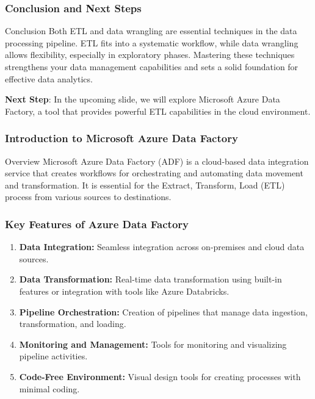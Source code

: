 \documentclass[aspectratio=169]{beamer}
\begin{document}
\begin{frame}[fragile]
    \frametitle{Conclusion and Next Steps}

    \begin{block}{Conclusion}
        Both ETL and data wrangling are essential techniques in the data processing pipeline. ETL fits into a systematic workflow, while data wrangling allows flexibility, especially in exploratory phases. Mastering these techniques strengthens your data management capabilities and sets a solid foundation for effective data analytics.
    \end{block}

    \textbf{Next Step}: In the upcoming slide, we will explore Microsoft Azure Data Factory, a tool that provides powerful ETL capabilities in the cloud environment.
\end{frame}

\begin{frame}
    \frametitle{Introduction to Microsoft Azure Data Factory}
    \begin{block}{Overview}
        Microsoft Azure Data Factory (ADF) is a cloud-based data integration service that creates workflows for orchestrating and automating data movement and transformation. It is essential for the Extract, Transform, Load (ETL) process from various sources to destinations.
    \end{block}
\end{frame}

\begin{frame}
    \frametitle{Key Features of Azure Data Factory}
    \begin{enumerate}
        \item \textbf{Data Integration:} Seamless integration across on-premises and cloud data sources.
        \item \textbf{Data Transformation:} Real-time data transformation using built-in features or integration with tools like Azure Databricks.
        \item \textbf{Pipeline Orchestration:} Creation of pipelines that manage data ingestion, transformation, and loading.
        \item \textbf{Monitoring and Management:} Tools for monitoring and visualizing pipeline activities.
        \item \textbf{Code-Free Environment:} Visual design tools for creating processes with minimal coding.
    \end{enumerate}
\end{frame}
\end{document}
